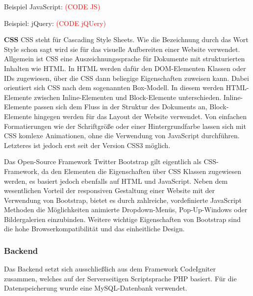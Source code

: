     Beispiel JavaScript:
    \textcolor{red}{(CODE JS)}

    Beispiel: jQuery:
    \textcolor{red}{(CODE jQUery)}

    \textbf{CSS}
    {CSS\cite{css}} steht für Cascading Style Sheets. Wie die Bezeichnung durch das Wort Style schon sagt wird sie für das visuelle Aufbereiten einer Website verwendet.
    Allgemein ist CSS eine Auszeichnungssprache für Dokumente mit strukturierten Inhalten wie HTML. In HTML werden dafür den DOM-Elementen Klassen oder IDs
    zugewiesen, über die CSS dann beliegige Eigenschaften zuweisen kann. Dabei orientiert sich CSS nach dem sogenannten Box-Modell. In diesem werden HTML-Elemente
    zwischen Inline-Elementen und Block-Elemente unterschieden. Inline-Elemente passen sich dem Fluss in der Struktur des Dokuments an, Block-Elemente hingegen
    werden für das Layout der Website verwendet. Von einfachen Formatierungen wie der Schriftgröße oder einer Hintergrundfarbe lassen sich mit CSS komlexe Animationen,
    ohne die Verwendung von JavaScript durchführen. Letzteres ist jedoch erst seit der Version CSS3 möglich.

    Das Open-Source Framework {Twitter Bootstrap\cite{bootstrap}} gilt eigentlich als CSS-Framework, da den Elementen die Eigenschaften über CSS Klassen zugewiesen werden, es basiert jedoch
    ebenfalls auf HTML und JavaScript. Neben dem wesentlichen Vorteil der responsiven Gestaltung einer Website mit der Verwendung von Bootstrap, bietet es durch
    zahlreiche, vordefinierte JavaScript Methoden die Möglichkeiten animierte Dropdown-Menüs, Pop-Up-Windows oder Bildergalerien einzubinden.
    Weitere wichtige Eigenschaften von Bootstrap sind die hohe Browserkompatibilität und das einheitliche Design.

    \subsubsection{Backend}
    Das Backend setzt sich ausschließlich aus dem Framework CodeIgniter zusammen, welches auf der Serverseitigen Scriptsprache PHP basiert. Für die Datenspeicherung
    wurde eine MySQL-Datenbank verwendet.

